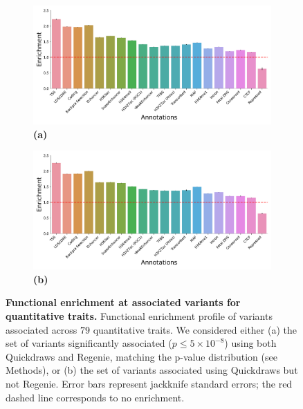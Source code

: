\begin{figure}[h!]
    \centering
    \begin{subfigure}{0.5\textwidth}
    \captionsetup{justification=raggedright,singlelinecheck=false}
    \caption*{\textbf{(a)}}
    \includegraphics[width=\textwidth]{figures/functional/annotation_both_quant.pdf}
    \end{subfigure}%
    \begin{subfigure}{0.5\textwidth}
    \captionsetup{justification=raggedright,singlelinecheck=false}
    \caption*{\textbf{(b)}}
    \includegraphics[width=\textwidth]{figures/functional/annotation_onlyqd_quant.pdf}
    \end{subfigure}
    \caption{\textbf{Functional enrichment at associated variants for quantitative traits.}
    Functional enrichment profile of variants associated across $79$ quantitative traits.
    We considered either (a) the set of variants significantly associated ($p \leq 5 \times 10^{-8}$) using both Quickdraws and Regenie, matching the p-value distribution (see Methods), or (b) the set of variants associated using Quickdraws but not Regenie.
    Error bars represent jackknife standard errors; the red dashed line corresponds to no enrichment.
    }
    \label{fig:functional_qt}
\end{figure}

